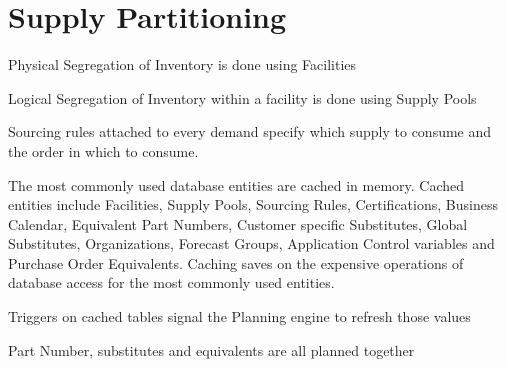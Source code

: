 \section{Supply Partitioning}
Physical Segregation of Inventory is done using Facilities

Logical Segregation of Inventory within a facility is done using Supply Pools

Sourcing rules attached to every demand specify which supply to consume and the order in which to consume. 

The most commonly used database entities are cached in memory. Cached entities include Facilities, Supply Pools, Sourcing Rules, Certifications, Business Calendar, Equivalent Part Numbers, Customer specific Substitutes, Global Substitutes, Organizations, Forecast Groups, Application Control variables and Purchase Order Equivalents. Caching saves on the expensive operations of database access for the most commonly used entities.

Triggers on cached tables signal the Planning engine to refresh those values

Part Number, substitutes and equivalents are all planned together

